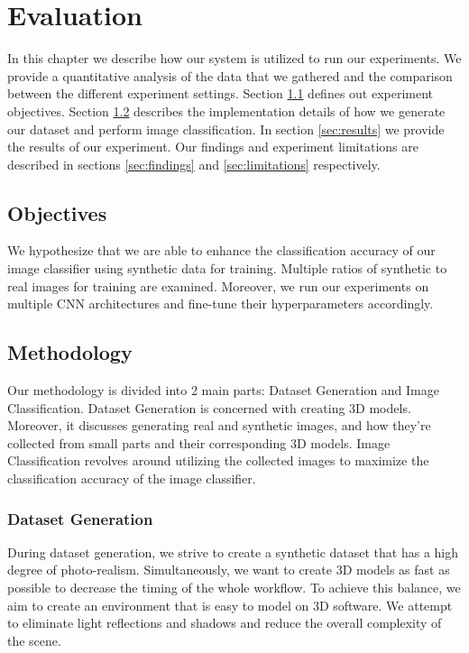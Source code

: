 \chapter{Evaluation}\label{ch:evaluation}

In this chapter we describe how our system is utilized to run our experiments. We provide a quantitative analysis of the data that we gathered and the comparison between the different experiment settings. Section \ref{sec:objectives} defines out experiment objectives. Section \ref{sec:methodology} describes the implementation details of how we generate our dataset and perform image classification. In section \ref{sec:results} we provide the results of our experiment. Our findings and experiment limitations are described in sections \ref{sec:findings} and \ref{sec:limitations} respectively.


\section{Objectives}\label{sec:objectives}

We hypothesize that we are able to enhance the classification accuracy of our image classifier using synthetic data for training. Multiple ratios of synthetic to real images for training are examined. Moreover, we run our experiments on multiple CNN architectures and fine-tune their hyperparameters accordingly.


\section{Methodology}\label{sec:methodology}

Our methodology is divided into 2 main parts: Dataset Generation and Image Classification. Dataset Generation is concerned with creating 3D models. Moreover, it discusses generating real and synthetic images, and how they're collected from small parts and their corresponding 3D models. Image Classification revolves around utilizing the collected images to maximize the classification accuracy of the image classifier.


\subsection{Dataset Generation}

During dataset generation, we strive to create a synthetic dataset that has a high degree of photo-realism. Simultaneously, we want to create 3D models as fast as possible to decrease the timing of the whole workflow. To achieve this balance, we aim to create an environment that is easy to model on 3D software. We attempt to eliminate light reflections and shadows and reduce the overall complexity of the scene.

